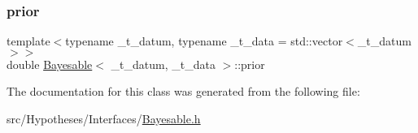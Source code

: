 \subsubsection{\texorpdfstring{prior}{prior}}
{\footnotesize\ttfamily template$<$typename \+\_\+t\+\_\+datum, typename \+\_\+t\+\_\+data = std\+::vector$<$\+\_\+t\+\_\+datum$>$$>$ \\
double \hyperlink{class_bayesable}{Bayesable}$<$ \+\_\+t\+\_\+datum, \+\_\+t\+\_\+data $>$\+::prior}



The documentation for this class was generated from the following file\+:\begin{DoxyCompactItemize}
\item 
src/\+Hypotheses/\+Interfaces/\hyperlink{_bayesable_8h}{Bayesable.\+h}\end{DoxyCompactItemize}
